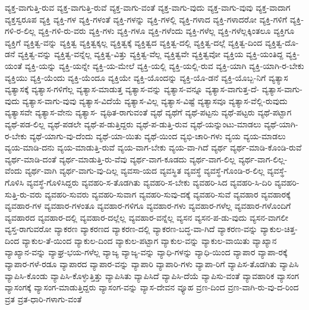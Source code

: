 {ವ್ಯಕ್ತ-ವಾಗುತ್ತಿ-ರುವ
ವ್ಯಕ್ತ-ವಾಗುತ್ತಿ-ರುವೆ
ವ್ಯಕ್ತ-ವಾಗು-ವಂತೆ
ವ್ಯಕ್ತ-ವಾಗು-ವುದು
ವ್ಯಕ್ತ-ವಾಗು-ವುವು
ವ್ಯಕ್ತ-ವಾದಾಗ
ವ್ಯಕ್ತಸ್ವರೂಪ
ವ್ಯಕ್ತಿ
ವ್ಯಕ್ತಿ-ಗಳ
ವ್ಯಕ್ತಿ-ಗಳಂತೆ
ವ್ಯಕ್ತಿ-ಗಳನ್ನು
ವ್ಯಕ್ತಿ-ಗಳಲ್ಲಿ
ವ್ಯಕ್ತಿ-ಗಳಾದ
ವ್ಯಕ್ತಿ-ಗಳಾದರೋ
ವ್ಯಕ್ತಿ-ಗಳಿಗೆ
ವ್ಯಕ್ತಿ-ಗಳಿ-ರ-ಲಿಲ್ಲ
ವ್ಯಕ್ತಿ-ಗಳಿ-ರು-ವರು
ವ್ಯಕ್ತಿ-ಗಳು
ವ್ಯಕ್ತಿ-ಗಳೂ
ವ್ಯಕ್ತಿ-ಗಳೆಂದು
ವ್ಯಕ್ತಿ-ಗಳೆಲ್ಲ
ವ್ಯಕ್ತಿ-ಗಳೆಲ್ಲಕ್ಕಿಂತಲೂ
ವ್ಯಕ್ತಿಗೂ
ವ್ಯಕ್ತಿಗೆ
ವ್ಯಕ್ತಿತ್ವ-ವನ್ನು
ವ್ಯಕ್ತಿತ್ವ
ವ್ಯಕ್ತಿತ್ವಕ್ಕಲ್ಲ
ವ್ಯಕ್ತಿತ್ವಕ್ಕೆ
ವ್ಯಕ್ತಿತ್ವದ
ವ್ಯಕ್ತಿತ್ವ-ದಲ್ಲಿ
ವ್ಯಕ್ತಿತ್ವ-ದಲ್ಲೆ
ವ್ಯಕ್ತಿತ್ವ-ದಿಂದ
ವ್ಯಕ್ತಿತ್ವ-ದೊ-ಡನೆ
ವ್ಯಕ್ತಿತ್ವ-ವನ್ನು
ವ್ಯಕ್ತಿತ್ವ-ವನ್ನೆಲ್ಲ
ವ್ಯಕ್ತಿತ್ವ-ವಿತ್ತು
ವ್ಯಕ್ತಿತ್ವ-ವೆಲ್ಲ
ವ್ಯಕ್ತಿತ್ವವೇ
ವ್ಯಕ್ತಿತ್ವವೋ
ವ್ಯಕ್ತಿಯ
ವ್ಯಕ್ತಿ-ಯಂತಿದ್ದ
ವ್ಯಕ್ತಿ-ಯಂತೆ
ವ್ಯಕ್ತಿ-ಯನ್ನು
ವ್ಯಕ್ತಿ-ಯನ್ನೇ
ವ್ಯಕ್ತಿ-ಯ-ಮೇಲೆ
ವ್ಯಕ್ತಿ-ಯಲ್ಲಿ
ವ್ಯಕ್ತಿ-ಯಲ್ಲಿ-ರುವ
ವ್ಯಕ್ತಿ-ಯಾಗಿ
ವ್ಯಕ್ತಿ-ಯಾಗಿ-ರ-ಬೇಕು
ವ್ಯಕ್ತಿಯು
ವ್ಯಕ್ತಿ-ಯೆಂದು
ವ್ಯಕ್ತಿ-ಯೆಂದೂ
ವ್ಯಕ್ತಿಯೇ
ವ್ಯಕ್ತಿ-ಯೊಂದನ್ನು
ವ್ಯಕ್ತಿ-ಯೊ-ಡನೆ
ವ್ಯಕ್ತಿ-ಯೊಬ್ಬ-ನಿಗೆ
ವ್ಯತ್ಯಾಸ
ವ್ಯತ್ಯಾಸಕ್ಕೆ
ವ್ಯತ್ಯಾಸ-ಗಳಿಗೆಲ್ಲ
ವ್ಯತ್ಯಾಸ-ಮಾಡುತ್ತ
ವ್ಯತ್ಯಾಸ-ವನ್ನು
ವ್ಯತ್ಯಾಸ-ವನ್ನೂ
ವ್ಯತ್ಯಾಸ-ವಾಗುತ್ತ-ದೆ-
ವ್ಯತ್ಯಾಸ-ವಾಗು-ವುದು
ವ್ಯತ್ಯಾಸ-ವಾಗು-ವುವು
ವ್ಯತ್ಯಾಸ-ವಿದೆಯೆ
ವ್ಯತ್ಯಾಸ-ವಿಲ್ಲ
ವ್ಯತ್ಯಾಸ-ವಿಷ್ಟೆ
ವ್ಯತ್ಯಾಸವೂ
ವ್ಯತ್ಯಾಸ-ವೆಲ್ಲಿ-ರುವುದು
ವ್ಯತ್ಯಾಸವೇ
ವ್ಯತ್ಯಾಸ-ವೇನು
ವ್ಯತ್ಯಾಸ-
ವ್ಯಥಿತ-ರಾಗುವಂತೆ
ವ್ಯಥೆ
ವ್ಯಥೆಗೆ
ವ್ಯಥೆ-ಪಟ್ಟನು
ವ್ಯಥೆ-ಪಟ್ಟರು
ವ್ಯಥೆ-ಪಟ್ಟಾಗ
ವ್ಯಥೆ-ಪಡ-ಲಿಲ್ಲ
ವ್ಯಥೆ-ಪಡಲೇ
ವ್ಯಥೆ-ಪ-ಡುತ್ತಿದ್ದರು
ವ್ಯಥೆ-ಪ-ಡುತ್ತಿ-ರುವ
ವ್ಯಥೆ-ಯನ್ನುಂಟು-ಮಾಡಲು
ವ್ಯಥೆ-ಯಾಗಿ-ರ-ಬೇಕು
ವ್ಯಥೆ-ಯಾಗು-ವು-ದೆಂದು
ವ್ಯಥೆ-ಯಾ-ಯಿತು
ವ್ಯಥೆ-ಯಿಂದ
ವ್ಯಭಿ-ಚಾರಿ-ಗಳು
ವ್ಯಯ
ವ್ಯಯ-ಮಾಡಲು
ವ್ಯಯ-ಮಾಡಿ-ದನು
ವ್ಯಯ-ಮಾಡುತ್ತಿ-ರುವೆ
ವ್ಯಯ-ವಾಗ-ಬೇಕು
ವ್ಯಯ-ವಾ-ಗಿದೆ
ವ್ಯರ್ಥ
ವ್ಯರ್ಥ-ಮಾಡಿ-ಕೊಂಡಿ-ರುವೆ
ವ್ಯರ್ಥ-ಮಾಡಿ-ದಂತೆ
ವ್ಯರ್ಥ-ಮಾಡುತ್ತಿ-ರು-ವೆವು
ವ್ಯರ್ಥ-ವಾಗ-ಕೂಡದು
ವ್ಯರ್ಥ-ವಾಗ-ಲಿಲ್ಲ
ವ್ಯರ್ಥ-ವಾಗ-ಲಿಲ್ಲ-ವೆಂದು
ವ್ಯರ್ಥ-ವಾಗಿ
ವ್ಯರ್ಥ-ವಾಗು-ವು-ದಿಲ್ಲ
ವ್ಯವಸಾ-ಯದ
ವ್ಯವಸ್ಥಿತ
ವ್ಯವಸ್ಥೆ
ವ್ಯವಸ್ಥೆ-ಗೊಂಡಿ-ರ-ಲಿಲ್ಲ
ವ್ಯವಸ್ಥೆ-ಗೊಳಿಸಿ
ವ್ಯವಸ್ಥೆ-ಗೊಳಿಸಿದ್ದರು
ವ್ಯವಹರಿ-ಸ-ತೊಡಗಿತು
ವ್ಯವಹರಿ-ಸ-ಬೇಕು
ವ್ಯವಹರಿ-ಸಿದ
ವ್ಯವಹರಿ-ಸಿ-ದಿರಿ
ವ್ಯವಹರಿ-ಸುತ್ತಿ-ರು-ವರು
ವ್ಯವಹರಿ-ಸುವರು
ವ್ಯವಹರಿ-ಸುವಾಗ
ವ್ಯವಹರಿ-ಸುವು-ದಕ್ಕೆ
ವ್ಯವಹರಿ-ಸುವೆ
ವ್ಯವಹಾರ
ವ್ಯವಹಾರಕ್ಕೆ
ವ್ಯವಹಾರ-ಗಳ
ವ್ಯವಹಾರ-ಗಳಂತೂ
ವ್ಯವಹಾರ-ಗಳಿಗೂ
ವ್ಯವಹಾರ-ಗಳು
ವ್ಯವಹಾರ-ಗಳೆಲ್ಲ
ವ್ಯವಹಾರ-ಗಳೊಂದಿಗೆ
ವ್ಯವಹಾರದ
ವ್ಯವಹಾರ-ದಲ್ಲಿ
ವ್ಯವಹಾರ-ದಲ್ಲೆಲ್ಲ
ವ್ಯವಹಾರ-ವನ್ನೆಲ್ಲ
ವ್ಯಸನ
ವ್ಯಸನ-ಪ-ಡು-ವುದು
ವ್ಯಸನ-ವಾಗಲೀ
ವ್ಯಸ್ತ-ರಾಗುವರೋ
ವ್ಯಾಕರಣ
ವ್ಯಾಕರಣದ
ವ್ಯಾಕರಣ-ದಲ್ಲಿ
ವ್ಯಾಕರಣ-ಬದ್ಧ-ವಾ-ಗಿದೆ
ವ್ಯಾಕರಣ-ವನ್ನು
ವ್ಯಾಕುಲ-ಚಿತ್ತ-ದಿಂದ
ವ್ಯಾಕುಲ-ತೆ-ಯಿಂದ
ವ್ಯಾಕುಲ-ದಿಂದ
ವ್ಯಾಕುಲ-ಪಟ್ಟಾಗ
ವ್ಯಾಕುಲ-ವನ್ನು
ವ್ಯಾಕುಲ-ವಾಯಿತು
ವ್ಯಾಖ್ಯಾನ
ವ್ಯಾಖ್ಯಾನ-ವನ್ನು
ವ್ಯಾಘ್ರ-ಭಯ-ಗಳೆಲ್ಲ
ವ್ಯಾಜ್ಯ
ವ್ಯಾಜ್ಯ-ವನ್ನು
ವ್ಯಾಧಿ-ಗಳನ್ನು
ವ್ಯಾಧಿ-ಯಿಂದ
ವ್ಯಾಪಾರ
ವ್ಯಾಪಾ-ರಕ್ಕೆ
ವ್ಯಾಪಾರ-ಗಳೆ-ರಡೂ
ವ್ಯಾಪಾರದ
ವ್ಯಾಪಾರ-ವನ್ನು
ವ್ಯಾಪಾರಿ
ವ್ಯಾಪಾರಿ-ಗಳು
ವ್ಯಾಪಾ-ರಿಗೆ
ವ್ಯಾಪಿಸ-ತೊಡಗಿತು
ವ್ಯಾಪಿಸಿ
ವ್ಯಾಪಿಸಿ-ಕೊಂಡು
ವ್ಯಾಪಿಸಿ-ಕೊಳ್ಳುತ್ತಿತ್ತು
ವ್ಯಾಪಿಸಿತು
ವ್ಯಾಪಿಸಿದೆ
ವ್ಯಾಪಿಸಿ-ದೆಯೆ
ವ್ಯಾಪಿಸು-ವಂತೆ
ವ್ಯಾವಹಾರಿಕ
ವ್ಯಾಸಂಗ
ವ್ಯಾಸಂಗಕ್ಕೆ
ವ್ಯಾಸಂಗ-ಮಾಡುತ್ತಿದ್ದರು
ವ್ಯಾಸಂಗ-ವನ್ನು
ವ್ಯಾಸ-ದೇವನ
ವ್ಯೂಹ
ವ್ರಣ-ದಿಂದ
ವ್ರಣ-ವಾಗಿ-ರು-ವು-ದ-ರಿಂದ
ವ್ರತ
ವ್ರತ-ಧಾರಿ-ಗಳಾಗು-ವಂತೆ
}
